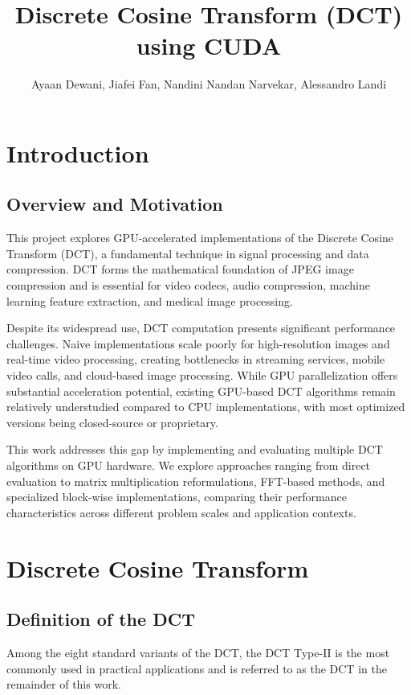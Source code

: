 \documentclass{article}
\title{Discrete Cosine Transform (DCT) using CUDA }
\author{Ayaan Dewani, Jiafei Fan, Nandini Nandan Narvekar, Alessandro Landi}
\begin{document}
\maketitle
\newpage

\section{Introduction}

\subsection{Overview and Motivation}

This project explores GPU-accelerated implementations of the Discrete Cosine Transform (DCT), a fundamental technique in signal processing and data compression. DCT forms the mathematical foundation of JPEG image compression and is essential for video codecs, audio compression, machine learning feature extraction, and medical image processing.

Despite its widespread use, DCT computation presents significant performance challenges. Naive implementations scale poorly for high-resolution images and real-time video processing, creating bottlenecks in streaming services, mobile video calls, and cloud-based image processing. While GPU parallelization offers substantial acceleration potential, existing GPU-based DCT algorithms remain relatively understudied compared to CPU implementations, with most optimized versions being closed-source or proprietary.

This work addresses this gap by implementing and evaluating multiple DCT algorithms on GPU hardware. We explore approaches ranging from direct evaluation to matrix multiplication reformulations, FFT-based methods, and specialized block-wise implementations, comparing their performance characteristics across different problem scales and application contexts.


\section{Discrete Cosine Transform}

\subsection{Definition of the DCT}

Among the eight standard variants of the DCT, the DCT Type-II is the most commonly used in practical applications and is referred to as the DCT in the remainder of this work.
\end{document}
